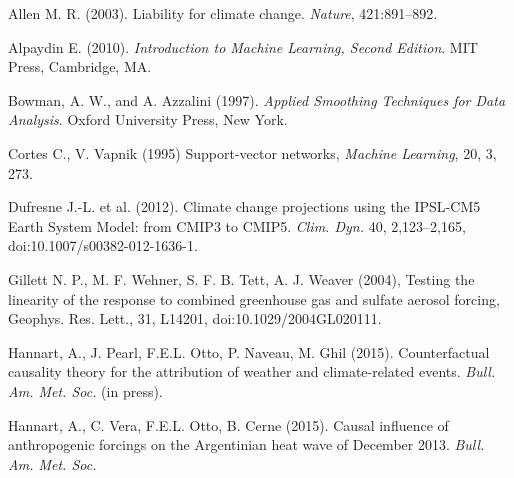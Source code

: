 \documentclass[12pt]{article}
\begin{document}
\begin{thebibliography}{00}

Allen M. R. (2003). Liability for climate change. {\em Nature}, 421:891--892.

Alpaydin E. (2010). {\em Introduction to Machine Learning, Second Edition}. MIT Press, Cambridge, MA.
%
%

Bowman, A. W., and A. Azzalini (1997). {\em Applied Smoothing Techniques for Data Analysis}. Oxford University Press, New York.

Cortes C., V. Vapnik (1995) Support-vector networks, {\em Machine Learning}, 20, 3, 273.

Dufresne J.-L. et al. (2012). Climate change projections using the IPSL-CM5 Earth System Model: from CMIP3 to CMIP5. {\em Clim. Dyn.} 40, 2,123--2,165, doi:10.1007/s00382-012-1636-1.

%

Gillett N. P., M. F. Wehner, S. F. B. Tett, A. J. Weaver (2004), Testing the linearity of the response to combined greenhouse gas and sulfate aerosol forcing, {Geophys.
Res. Lett.}, 31, L14201, doi:10.1029/2004GL020111.
%

Hannart, A., J. Pearl, F.E.L. Otto, P. Naveau, M. Ghil (2015). Counterfactual causality theory for the attribution of weather and climate-related events. {\em Bull. Am. Met. Soc.} (in press).

Hannart, A., C. Vera, F.E.L. Otto, B. Cerne (2015). Causal influence of anthropogenic forcings on the Argentinian heat wave of December 2013. {\em Bull. Am. Met. Soc.}


\end{thebibliography}
\end{document}
